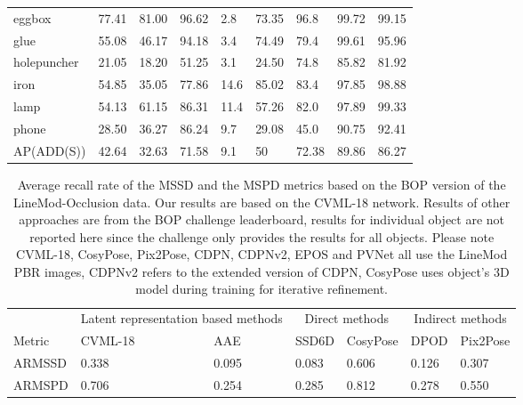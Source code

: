 \documentclass[9pt,a4paper,twoside]{tau}
\begin{document}
\begin{table}[H]
\begin{tabular}{lllllllll}
eggbox      & 77.41              & 81.00            & 96.62             & 2.8           & 73.35  & 96.8      & 99.72  & 99.15 \\
glue        & 55.08              & 46.17            & 94.18             & 3.4           & 74.49  & 79.4      & 99.61  & 95.96 \\
holepuncher & 21.05              & 18.20            & 51.25             & 3.1           & 24.50  & 74.8      & 85.82  & 81.92 \\
iron        & 54.85              & 35.05            & 77.86             & 14.6          & 85.02  & 83.4      & 97.85  & 98.88 \\
lamp        & 54.13              & 61.15            & 86.31             & 11.4          & 57.26  & 82.0      & 97.89  & 99.33 \\
phone       & 28.50              & 36.27            & 86.24             & 9.7           & 29.08  & 45.0      & 90.75  & 92.41 \\
AP(ADD(S))  & 42.64              & 32.63            & 71.58             & 9.1           & 50     & 72.38     & 89.86  & 86.27
\end{tabular}

    \end{table}

    \begin{table}[H]
        \centering
        \caption{Average recall rate of the MSSD and the MSPD metrics based on the BOP version of the LineMod-Occlusion data. Our results are based on the CVML-18 network. Results of other approaches are from the BOP challenge leaderboard, results for individual object are not reported here since the challenge only provides the results for all objects. Please note CVML-18, CosyPose, Pix2Pose, CDPN, CDPNv2, EPOS and PVNet all use the LineMod PBR images, CDPNv2 refers to the extended version of CDPN, CosyPose uses object’s 3D model during training for iterative refinement.}
    \label{tab:table}
\begin{tabular}{lllllll}
       & \multicolumn{2}{c}{Latent representation based methods} & \multicolumn{2}{c}{Direct methods} & \multicolumn{2}{c}{Indirect methods} \\
Metric & CVML-18                     & AAE                       & SSD6D          & CosyPose          & DPOD            & Pix2Pose           \\
ARMSSD & 0.338                       & 0.095                     & 0.083          & 0.606             & 0.126           & 0.307              \\
ARMSPD & 0.706                       & 0.254                     & 0.285          & 0.812             & 0.278           & 0.550             
\end{tabular}      
    \end{table}
\end{document}
